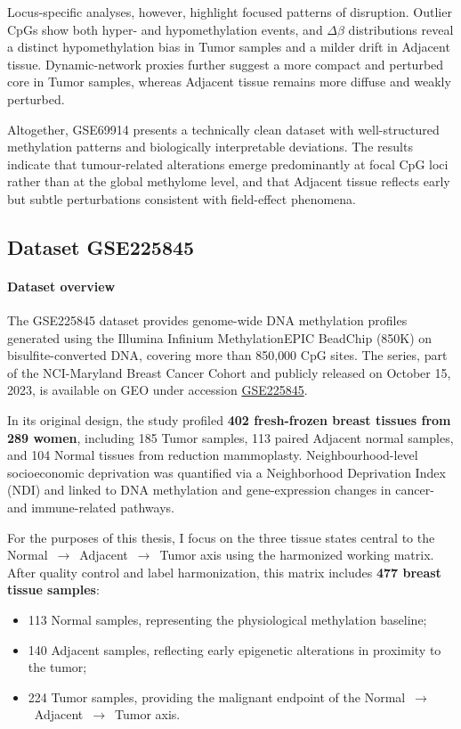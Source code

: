 \documentclass[10pt]{extarticle}
\begin{document}
Locus-specific analyses, however, highlight focused patterns of disruption. Outlier CpGs 
show both hyper- and hypomethylation events, and $\Delta\beta$ distributions reveal a 
distinct hypomethylation bias in Tumor samples and a milder drift in Adjacent tissue. 
Dynamic-network proxies further suggest a more compact and perturbed core in Tumor 
samples, whereas Adjacent tissue remains more diffuse and weakly perturbed.

Altogether, GSE69914 presents a technically clean dataset with well-structured methylation 
patterns and biologically interpretable deviations. The results indicate that tumour-related 
alterations emerge predominantly at focal CpG loci rather than at the global methylome level, 
and that Adjacent tissue reflects early but subtle perturbations consistent with 
field-effect phenomena.


\subsection{Dataset GSE225845}
\label{subsec:gse225845}

\paragraph{Dataset overview}
\label{par:gse225845_overview}

The GSE225845 dataset provides genome-wide DNA methylation profiles generated using the
Illumina Infinium MethylationEPIC BeadChip (850K) on bisulfite-converted DNA, covering more
than 850{,}000 CpG sites. The series, part of the NCI-Maryland Breast Cancer Cohort and
publicly released on October 15, 2023, is available on GEO under accession
\href{https://www.ncbi.nlm.nih.gov/geo/query/acc.cgi?acc=GSE225845}{GSE225845}.

In its original design, the study profiled \textbf{402 fresh-frozen breast tissues from 289 women},
including 185 Tumor samples, 113 paired Adjacent normal samples, and 104 Normal tissues from
reduction mammoplasty. Neighbourhood-level socioeconomic deprivation was quantified via a
Neighborhood Deprivation Index (NDI) and linked to DNA methylation and gene-expression
changes in cancer- and immune-related pathways.

For the purposes of this thesis, I focus on the three tissue states central to the
Normal~$\rightarrow$~Adjacent~$\rightarrow$~Tumor axis using the harmonized working matrix.
After quality control and label harmonization, this matrix includes \textbf{477 breast tissue samples}:
\begin{itemize}[label=-]
    \item 113 Normal samples, representing the physiological methylation baseline;
    \item 140 Adjacent samples, reflecting early epigenetic alterations in proximity to the tumor;
    \item 224 Tumor samples, providing the malignant endpoint of the Normal~$\rightarrow$~Adjacent~$\rightarrow$~Tumor axis.
\end{itemize}
\end{document}
